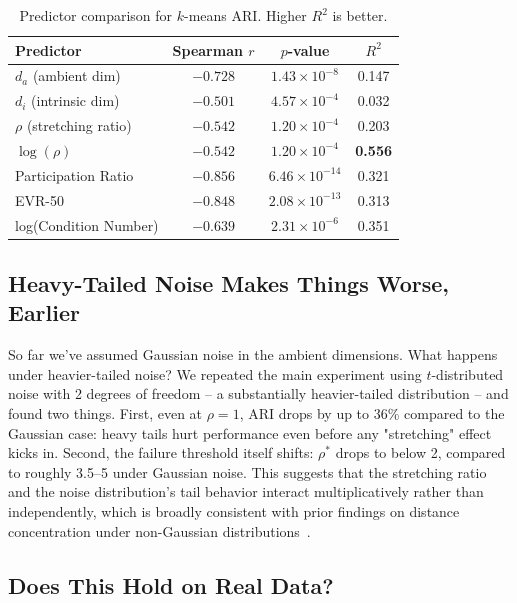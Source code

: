 \documentclass[pdflatex,sn-mathphys-num]{sn-jnl}
\theoremstyle{thmstyleone}
\begin{document}
\begin{table}[h]
\centering
\caption{Predictor comparison for $k$-means ARI. Higher $R^2$ is better.}
\label{tab:predictors}
\begin{tabular}{lccc}
\toprule
Predictor & Spearman $r$ & $p$-value & $R^2$ \\
\midrule
$d_a$ (ambient dim)       & $-0.728$ & $1.43 \times 10^{-8}$  & 0.147 \\
$d_i$ (intrinsic dim)     & $-0.501$ & $4.57 \times 10^{-4}$  & 0.032 \\
$\rho$ (stretching ratio) & $-0.542$ & $1.20 \times 10^{-4}$  & 0.203 \\
$\log(\rho)$              & $-0.542$ & $1.20 \times 10^{-4}$  & \textbf{0.556} \\
Participation Ratio       & $-0.856$ & $6.46 \times 10^{-14}$ & 0.321 \\
EVR-50                    & $-0.848$ & $2.08 \times 10^{-13}$ & 0.313 \\
log(Condition Number)     & $-0.639$ & $2.31 \times 10^{-6}$  & 0.351 \\
\bottomrule
\end{tabular}
\end{table}

\subsection{Heavy-Tailed Noise Makes Things Worse, Earlier}

So far we've assumed Gaussian noise in the ambient dimensions. What happens
under heavier-tailed noise? We repeated the main experiment using
$t$-distributed noise with 2 degrees of freedom -- a substantially
heavier-tailed distribution -- and found two things. First, even at $\rho=1$,
ARI drops by up to 36\% compared to the Gaussian case: heavy tails hurt
performance even before any "stretching" effect kicks in. Second, the failure
threshold itself shifts: $\rho^*$ drops to below 2, compared to roughly 3.5--5
under Gaussian noise. This suggests that the stretching ratio and the noise
distribution's tail behavior interact multiplicatively rather than
independently, which is broadly consistent with prior findings on distance
concentration under non-Gaussian distributions~\cite{aggarwal2001}.

\subsection{Does This Hold on Real Data?}
\end{document}
